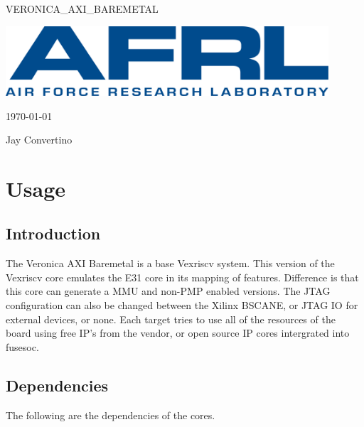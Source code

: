 \begin{titlepage}
  \begin{center}

  {\Huge VERONICA\_AXI\_BAREMETAL}

  \vspace{25mm}

  \includegraphics[width=0.90\textwidth,height=\textheight,keepaspectratio]{img/AFRL.png}

  \vspace{25mm}

  \today

  \vspace{15mm}

  {\Large Jay Convertino}

  \end{center}
\end{titlepage}

\tableofcontents

\newpage

\section{Usage}

\subsection{Introduction}

\par
The Veronica AXI Baremetal is a base Vexriscv system. This version of the Vexriscv core emulates the E31 core in its mapping of features.
Difference is that this core can generate a MMU and non-PMP enabled versions. The JTAG configuration can also be changed between the Xilinx BSCANE, or
JTAG IO for external devices, or none. Each target tries to use all of the resources of the board using free IP's from the vendor, or open source
IP cores intergrated into fusesoc.

\subsection{Dependencies}

\par
The following are the dependencies of the cores.

